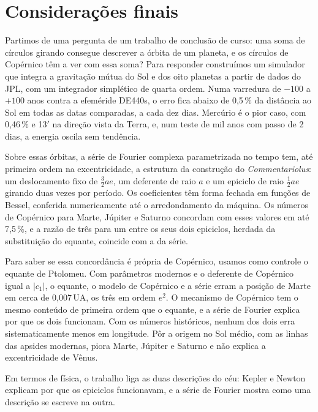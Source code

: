 \section{Considerações finais}\label{cap:conclusao}

Partimos de uma pergunta de um trabalho de conclusão de curso: uma soma de círculos girando consegue descrever a órbita de um planeta, e os círculos de Copérnico têm a ver com essa soma? Para responder construímos um simulador que integra a gravitação mútua do Sol e dos oito planetas a partir de dados do JPL, com um integrador simplético de quarta ordem. Numa varredura de $-100$ a $+100$ anos contra a efeméride DE440s, o erro fica abaixo de 0,5\,\% da distância ao Sol em todas as datas comparadas, a cada dez dias. Mercúrio é o pior caso, com 0,46\,\% e 13$'$ na direção vista da Terra, e, num teste de mil anos com passo de 2 dias, a energia oscila sem tendência.

Sobre essas órbitas, a série de Fourier complexa parametrizada no tempo tem, até primeira ordem na excentricidade, a estrutura da construção do \emph{Commentariolus}: um deslocamento fixo de $\frac32 ae$, um deferente de raio $a$ e um epiciclo de raio $\frac12 ae$ girando duas vezes por período. Os coeficientes têm forma fechada em funções de Bessel, conferida numericamente até o arredondamento da máquina. Os números de Copérnico para Marte, Júpiter e Saturno concordam com esses valores em até 7,5\,\%, e a razão de três para um entre os seus dois epiciclos, herdada da substituição do equante, coincide com a da série.

Para saber se essa concordância é própria de Copérnico, usamos como controle o equante de Ptolomeu. Com parâmetros modernos e o deferente de Copérnico igual a $|c_1|$, o equante, o modelo de Copérnico e a série erram a posição de Marte em cerca de 0,007\,UA, os três em ordem $e^2$. O mecanismo de Copérnico tem o mesmo conteúdo de primeira ordem que o equante, e a série de Fourier explica por que os dois funcionam. Com os números históricos, nenhum dos dois erra sistematicamente menos em longitude. Pôr a origem no Sol médio, com as linhas das apsides modernas, piora Marte, Júpiter e Saturno e não explica a excentricidade de Vênus.

Em termos de física, o trabalho liga as duas descrições do céu: Kepler e Newton explicam por que os epiciclos funcionavam, e a série de Fourier mostra como uma descrição se escreve na outra.
